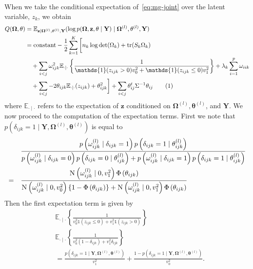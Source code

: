 \documentclass[a4paper, 11pt, oneside]{report}
\DeclareMathOperator{\tr}{tr}
\newcommand{\E}{\mathbb{E}}
\newcommand{\1}{\mathds{1}}
\newcommand{\powl}{^{(l)}}
\newcommand{\inv}{^{-1}}
\newcommand{\Nor}{\textsc{N}}
\newcommand{\bOmega}{\mathbf{\Omega}}
\newcommand{\bz}{\mathbf{z}}
\newcommand{\btheta}{\mathbf{\theta}}
\newcommand{\bY}{\mathbf{Y}}
\begin{document}
When we take the conditional expectation of~\eqref{eq:mg-joint} over the latent
variable, $z_k$, we obtain
\begin{align*}
	Q(\mathbf{\Omega}, \mathbf{\theta}) & =  \E_{\mathbf{z} \mid
	\mathbf{\Omega}\powl, \mathbf{\theta}\powl, \mathbf{Y}}(\log
	p(\mathbf{\Omega},  \mathbf{z}, \mathbf{\theta} \mid \mathbf{Y}) \mid
	\mathbf{\Omega}\powl, \mathbf{\theta}\powl, \mathbf{Y})                    \\
	                                    & =  \text{constant} -
	\frac{1}{2} \sum_{k=1}^K \bigg[ n_k \log\det(\Omega_k) +
	\tr(S_k \Omega_k)                                                          \\
	                                    & \quad + \sum_{i < j}
	\omega_{ijk}^2\E_{\cdot \mid \cdot}\left\{\frac{1}{\1(z_{ijk} > 0)v^2_0 +
		\1(z_{ijk} \leq 0)v^2_1}\right\} + \lambda_k \sum_{i=1}^p \omega_{iik}
	\\
	                                    & \quad + \sum_{i < j} -2 \theta_{ijk}
	\E_{\cdot \mid \cdot}(z_{ijk}) + \theta_{ijk}^2
	\bigg] + \sum_{i < j} \theta_{ij}^t \Sigma\inv \theta_{ij}
	\stepcounter{equation}\tag{\theequation}\label{eq:mg-exp}
\end{align*}
where $\E_{\cdot \mid \cdot}$ refers to the expectation of $\bz$ conditioned on
$\bOmega\powl, \btheta\powl$, and $\bY$.
We now proceed to the computation of the expectation terms.
First we note that $p(\delta_{ijk} = 1 \mid \bY, \bOmega\powl, \btheta\powl)$
is equal to
\begin{align*}
	       & \frac{p\left(\omega_{ijk}\powl \mid \delta_{ijk}=1\right) p\left(\delta_{ijk}=1 \mid
		\theta_{ijk}\powl\right)}{p\left(\omega_{ijk}\powl \mid \delta_{ijk}=0\right) p\left(\delta_{ijk}=0 \mid
		\theta_{ijk}\powl\right) + p\left(\omega_{ijk}\powl \mid \delta_{ijk}=1\right) p\left(\delta_{ijk}=1 \mid
	\theta_{ijk}\powl\right)}                                                                     \\
	=\quad & \frac{\Nor\left(\omega_{ijk}\powl \mid 0,
		v_1^2\right)\Phi\left(\theta_{ijk}\right)}{\Nor\left(\omega_{ijk}\powl \mid 0,
		v_0^2\right)\{1 -
		\Phi\left(\theta_{ijk}\right)\} +
		\Nor\left(\omega_{ijk}\powl \mid 0, v_1^2\right)
		\Phi\left(\theta_{ijk}\right)}
\end{align*}
Then the first expectation term is given by
\begin{align*}
	 & \E_{\cdot \mid \cdot} \left\{ \frac{1}{v_0^2 \1(z_{ijk} \leq 0) + v_1^2 \1(z_{ijk} > 0)} \right\} \\
	 & \E_{\cdot \mid \cdot} \left\{ \frac{1}{v_0^2 ( 1 - \delta_{ijk}) + v_1^2 \delta_{ijk}} \right\}   \\
	 & = \frac{p(\delta_{ijk} = 1 \mid \bY, \bOmega\powl, \btheta\powl)}{v_1^2}
	+ \frac{1 - p(\delta_{ijk} = 1 \mid \bY, \bOmega\powl,
		\btheta\powl)}{v_0^2}.
\end{align*}
\end{document}
